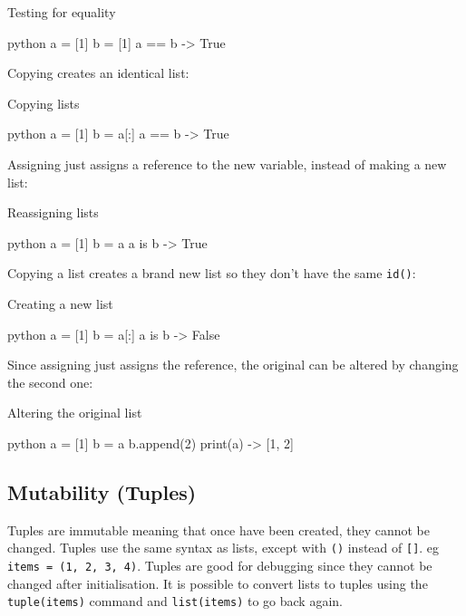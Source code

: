 \begin{highlight}{Testing for equality}
    \begin{code}{python}
		a = [1]
		b = [1]
		a == b -> True
    \end{code}
\end{highlight}

\noindent
Copying creates an identical list:

\begin{highlight}{Copying lists}
    \begin{code}{python}
		a = [1]
		b = a[:]
		a == b -> True
    \end{code}
\end{highlight}

\noindent
Assigning just assigns a reference to the new variable, instead of making a new list:

\begin{highlight}{Reassigning lists}
    \begin{code}{python}
		a = [1]
		b = a
		a is b -> True
    \end{code}
\end{highlight}

\noindent
Copying a list creates a brand new list so they don't have the same \texttt{id()}:

\begin{highlight}{Creating a new list}
    \begin{code}{python}
		a = [1]
		b = a[:]
		a is b -> False
    \end{code}
\end{highlight}

\noindent
Since assigning just assigns the reference, the original can be altered by changing the second one:

\begin{highlight}{Altering the original list}
    \begin{code}{python}
		a = [1]
		b = a
		b.append(2)
		print(a) -> [1, 2]
    \end{code}
\end{highlight}

\subsection{Mutability (Tuples)}\label{sub:mutability_tuples_}

Tuples are immutable meaning that once have been created, they cannot be changed.
Tuples use the same syntax as lists, except with \texttt{()} instead of \texttt{[]}. eg \texttt{items = (1, 2, 3, 4)}.
Tuples are good for debugging since they cannot be changed after initialisation.
It is possible to convert lists to tuples using the \texttt{tuple(items)} command and \texttt{list(items)} to go back again.

